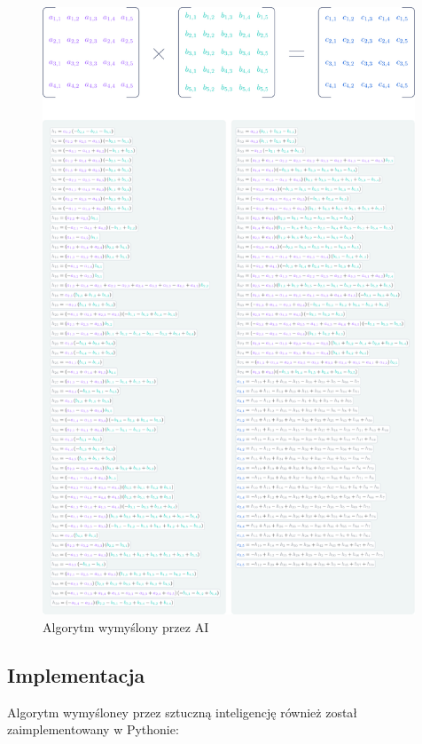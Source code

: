 \documentclass{article}
\begin{document}
\begin{figure}[H]
  \centering
    \includegraphics[width=0.99\textwidth]{AI.png}
  \caption{Algorytm wymyślony przez AI}
\end{figure}

\subsection{Implementacja}

Algorytm wymyśloney przez sztuczną inteligencję również został zaimplementowany w Pythonie:
\end{document}
